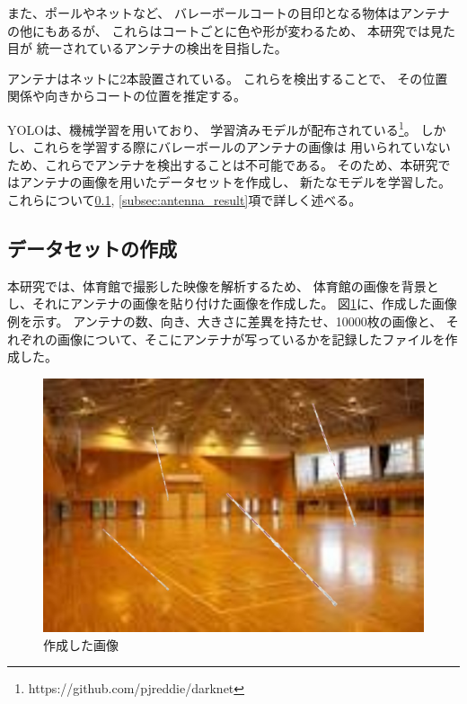 \documentclass[a4j, fleqn, 12pt]{jsreport}
\begin{document}
        また、ポールやネットなど、
        バレーボールコートの目印となる物体はアンテナの他にもあるが、
        これらはコートごとに色や形が変わるため、
        本研究では見た目が
        統一されているアンテナの検出を目指した。

        アンテナはネットに2本設置されている。
        これらを検出することで、
        その位置関係や向きからコートの位置を推定する。

        YOLOは、機械学習を用いており、
        学習済みモデルが配布されている\footnote{https://github.com/pjreddie/darknet}。
        しかし、これらを学習する際にバレーボールのアンテナの画像は
        用いられていないため、これらでアンテナを検出することは不可能である。
        そのため、本研究ではアンテナの画像を用いたデータセットを作成し、
        新たなモデルを学習した。
        これらについて\ref{subsec:dataset}, \ref{subsec:antenna_result}項で詳しく述べる。

        \subsection{データセットの作成} \label{subsec:dataset}
            本研究では、体育館で撮影した映像を解析するため、
            体育館の画像を背景とし、それにアンテナの画像を貼り付けた画像を作成した。
            図\ref{fig:pasted}に、作成した画像例を示す。
            アンテナの数、向き、大きさに差異を持たせ、10000枚の画像と、
            それぞれの画像について、そこにアンテナが写っているかを記録したファイルを作成した。

            \begin{figure}[ht]
                \centering
                \includegraphics[width=0.8\hsize]{images/00075.jpg}
                \caption{作成した画像}
                \label{fig:pasted}
            \end{figure}
\end{document}
